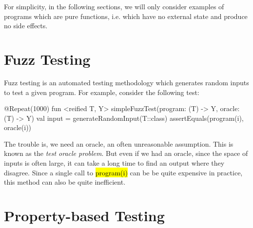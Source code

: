 \documentclass[12pt,initial,twoside,maitrise]{dms}
\newcommand{\inline}[1]{%
    \begingroup%
    \sethlcolor{slightgray}%
    \hl{\ttfamily\small #1}%
    \endgroup
}
\numberwithin{equation}{section}
\numberwithin{table}{chapter}
\numberwithin{figure}{chapter}
\begin{document}
For simplicity, in the following sections, we will only consider examples of programs which are pure functions, i.e. which have no external state and produce no side effects.

\section{Fuzz Testing}

Fuzz testing is an automated testing methodology which generates random inputs to test a given program. For example, consider the following test:
%
\begin{kotlinlisting}
@Repeat(1000)
fun <reified T, Y> simpleFuzzTest(program: (T) -> Y, oracle: (T) -> Y) {
        val input = generateRandomInput(T::class)
        assertEquals(program(i), oracle(i))
}
\end{kotlinlisting}
%
The trouble is, we need an oracle, an often unreasonable assumption. This is known as the \textit{test oracle problem}. But even if we had an oracle, since the space of inputs is often large, it can take a long time to find an output where they disagree. Since a single call to \inline{program(i)} can be be quite expensive in practice, this method can also be quite inefficient.

\section{Property-based Testing}\label{subsec:property-based-testing}
\end{document}
